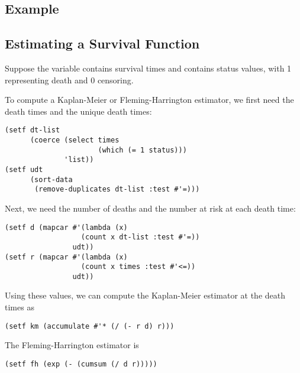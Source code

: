 \begin{slide}{}
\section{Example}
\subsection{Estimating a Survival Function}
Suppose the variable  contains survival times and
 contains status values, with 1 representing death and 0
censoring.

To compute a Kaplan-Meier or Fleming-Harrington estimator, we first
need the death times and the unique death times:
{\Large
\begin{verbatim}
(setf dt-list
      (coerce (select times
                      (which (= 1 status)))
              'list))
(setf udt
      (sort-data
       (remove-duplicates dt-list :test #'=)))
\end{verbatim}}
\end{slide}

\begin{slide}{}
Next, we need the number of deaths and the number at risk at each
death time:
{\Large
\begin{verbatim}
(setf d (mapcar #'(lambda (x)
                  (count x dt-list :test #'=))
                udt))
(setf r (mapcar #'(lambda (x)
                  (count x times :test #'<=))
                udt))
\end{verbatim}}
Using these values, we can compute the Kaplan-Meier estimator at the
death times as
{\Large
\begin{verbatim}
(setf km (accumulate #'* (/ (- r d) r)))
\end{verbatim}}
The Fleming-Harrington estimator is
{\Large
\begin{verbatim}
(setf fh (exp (- (cumsum (/ d r)))))
\end{verbatim}}
\end{slide}

